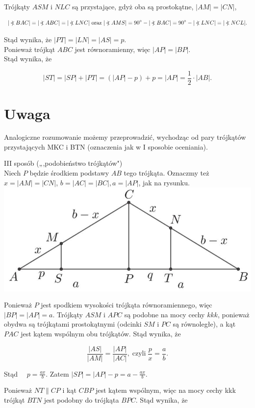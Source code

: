 \documentclass[10pt]{article}
\newcommand\Varangle{\mathop{{<\!\!\!\!\!\text{\small)}}\:}\nolimits}
\begin{document}
Trójkąty $A S M$ i $N L C$ są przystające, gdyż oba są prostokątne, $|A M|=|C N|$,

$$
|\Varangle B A C|=|\Varangle A B C|=|\Varangle L N C| \text { oraz }|\Varangle A M S|=90^{\circ}-|\Varangle B A C|=90^{\circ}-|\Varangle L N C|=|\Varangle N C L| .
$$

Stąd wynika, że $|P T|=|L N|=|A S|=p$.\\
Ponieważ trójkąt $A B C$ jest równoramienny, więc $|A P|=|B P|$.\\
Stąd wynika, że

$$
|S T|=|S P|+|P T|=(|A P|-p)+p=|A P|=\frac{1}{2} \cdot|A B| .
$$

\section*{Uwaga}
Analogiczne rozumowanie możemy przeprowadzić, wychodząc od pary trójkątów przystających MKC i BTN (oznaczenia jak w I sposobie oceniania).

III sposób („,podobieństwo trójkątów")\\
Niech $P$ będzie środkiem podstawy $A B$ tego trójkąta. Oznaczmy też $x=|A M|=|C N|$, $b=|A C|=|B C|, a=|A P|$, jak na rysunku.\\
\includegraphics[max width=\textwidth, center]{2025_02_07_d712b9a47aa2c64928dbg-17(1)}

Ponieważ $P$ jest spodkiem wysokości trójkąta równoramiennego, więc $|B P|=|A P|=a$. Trójkąty $A S M$ i $A P C$ są podobne na mocy cechy $k k k$, ponieważ obydwa są trójkątami prostokątnymi (odcinki $S M$ i $P C$ są równoległe), a kąt $P A C$ jest kątem wspólnym obu trójkątów. Stąd wynika, że

$$
\frac{|A S|}{|A M|}=\frac{|A P|}{|A C|}, \operatorname{czyli} \frac{p}{x}=\frac{a}{b} .
$$

Stąd $\quad p=\frac{a x}{b}$. Zatem $|S P|=|A P|-p=a-\frac{a x}{b}$.

Ponieważ $N T \| C P$ i kąt $C B P$ jest kątem wspólnym, więc na mocy cechy kkk trójkąt $B T N$ jest podobny do trójkąta $B P C$. Stąd wynika, że
\end{document}
